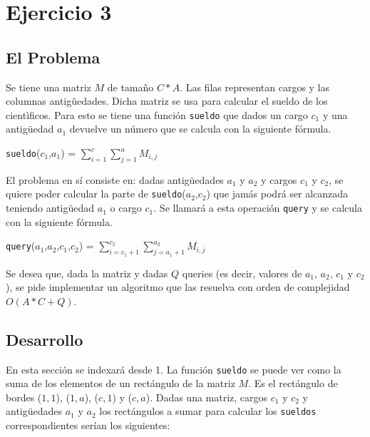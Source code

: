 \section{Ejercicio 3}
\subsection{El Problema}
Se tiene una matriz $M$ de tamaño $C*A$. Las filas representan cargos y las columnas antigûedades. Dicha matriz se usa para calcular el sueldo de los cientìficos. Para esto se tiene una función \texttt{sueldo} que dados un cargo $c_1$ y una antigüedad $a_1$ devuelve un número que se calcula con la siguiente fórmula.

\texttt{sueldo}($c_1$,$a_1$) = $\sum_{i=1}^{c} \sum_{j=1}^{a} M_{i,j}$

El problema en sí consiste en: dadas antigüedades $a_1$ y $a_2$ y cargos $c_1$ y $c_2$, se quiere poder calcular la parte de \texttt{sueldo}($a_2$,$c_2$) que jamás podrá ser alcanzada teniendo antigüedad $a_1$ o cargo $c_1$. Se llamará a esta operación \texttt{query} y se calcula con la siguiente fórmula.

\texttt{query}($a_1$,$a_2$,$c_1$,$c_2$) = $\sum_{i=c_1+1}^{c_2} \sum_{j=a_1+1}^{a_2} M_{i,j}$

Se desea que, dada la matriz y dadas $Q$ queries (es decir, valores de $a_1$, $a_2$, $c_1$ y $c_2$), se pide implementar un algoritmo que las resuelva con orden de complejidad $O(A*C + Q)$.

\subsection{Desarrollo}

En esta sección se indexará desde 1. La función \texttt{sueldo} se puede ver como la suma de los elementos de un rectángulo de la matriz $M$. Es el rectángulo de bordes ($1,1$), ($1,a$), ($c,1$) y ($c,a$). Dadas una matriz, cargos $c_1$ y $c_2$ y antigüedades $a_1$ y $a_2$ los rectángulos a sumar para calcular los \texttt{sueldos} correspondientes serían los siguientes:

